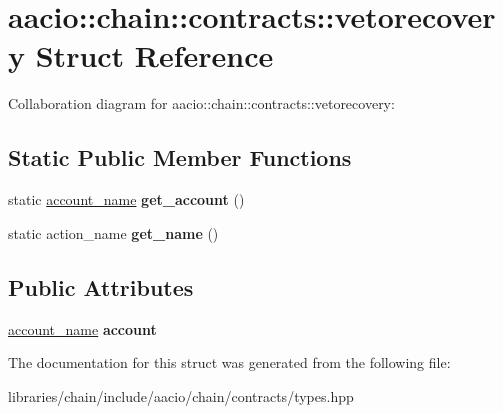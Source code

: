 \hypertarget{structaacio_1_1chain_1_1contracts_1_1vetorecovery}{}\section{aacio\+:\+:chain\+:\+:contracts\+:\+:vetorecovery Struct Reference}
\label{structaacio_1_1chain_1_1contracts_1_1vetorecovery}


Collaboration diagram for aacio\+:\+:chain\+:\+:contracts\+:\+:vetorecovery\+:
\subsection*{Static Public Member Functions}
\begin{DoxyCompactItemize}
\item 
\mbox{\label{structaacio_1_1chain_1_1contracts_1_1vetorecovery_a56a7284140571a157e06096bd7ce5259}} 
static \mbox{\hyperlink{structaacio_1_1chain_1_1name}{account\+\_\+name}} {\bfseries get\+\_\+account} ()
\item 
\mbox{\label{structaacio_1_1chain_1_1contracts_1_1vetorecovery_a5af6e451767f7bcd175b63344c375a8b}} 
static action\+\_\+name {\bfseries get\+\_\+name} ()
\end{DoxyCompactItemize}
\subsection*{Public Attributes}
\begin{DoxyCompactItemize}
\item 
\mbox{\label{structaacio_1_1chain_1_1contracts_1_1vetorecovery_a96b8ce133212b113b09f3bf6b695c2aa}} 
\mbox{\hyperlink{structaacio_1_1chain_1_1name}{account\+\_\+name}} {\bfseries account}
\end{DoxyCompactItemize}


The documentation for this struct was generated from the following file\+:\begin{DoxyCompactItemize}
\item 
libraries/chain/include/aacio/chain/contracts/types.\+hpp\end{DoxyCompactItemize}
